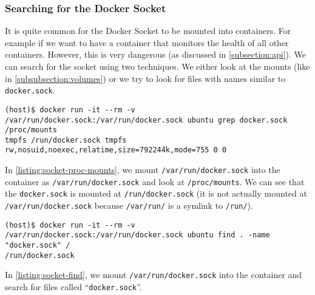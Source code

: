 \subsubsection{Searching for the Docker Socket}\label{subsubsection:searching-socket}
It is quite common for the Docker Socket to be mounted into containers. For example if we want to have a container that monitors the health of all other containers. However, this is very dangerous (as discussed in \autoref{subsection:api}). We can search for the socket using two techniques. We either look at the mounts (like in \autoref{subsubsection:volumes}) or we try to look for files with names similar to \lstinline{docker.sock}.

\begin{lstlisting}[caption={\lstinline{docker.sock} in \lstinline{/proc/mounts}.},captionpos=b,label={listing:socket-proc-mounts}]
(host)$ docker run -it --rm -v /var/run/docker.sock:/var/run/docker.sock ubuntu grep docker.sock /proc/mounts
tmpfs /run/docker.sock tmpfs rw,nosuid,noexec,relatime,size=792244k,mode=755 0 0
\end{lstlisting}

In \autoref{listing:socket-proc-mounts}, we mount \lstinline{/var/run/docker.sock} into the container as \lstinline{/var/run/docker.sock} and look at \lstinline{/proc/mounts}. We can see that the \lstinline{docker.sock} is mounted at \lstinline{/run/docker.sock} (it is not actually mounted at \lstinline{/var/run/docker.sock} because \lstinline{/var/run/} is a symlink to \lstinline{/run/}).

\medskip

\begin{lstlisting}[caption={Running \lstinline{find} to search for \lstinline{docker.sock}.},captionpos=b, label={listing:socket-find}]
(host)$ docker run -it --rm -v /var/run/docker.sock:/var/run/docker.sock ubuntu find . -name "docker.sock" /
/run/docker.sock
\end{lstlisting}

In \autoref{listing:socket-find}, we mount \lstinline{/var/run/docker.sock} into the container and search for files called ``\lstinline{docker.sock}''.
